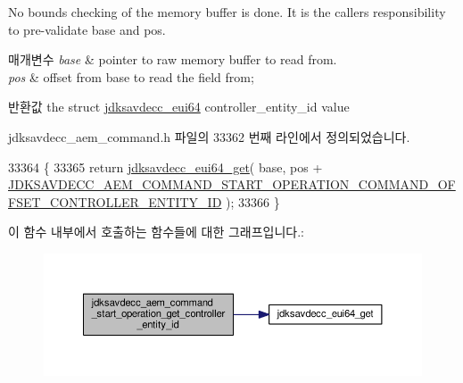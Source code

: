 No bounds checking of the memory buffer is done. It is the caller\textquotesingle{}s responsibility to pre-\/validate base and pos.


\begin{DoxyParams}{매개변수}
{\em base} & pointer to raw memory buffer to read from. \\
\hline
{\em pos} & offset from base to read the field from; \\
\hline
\end{DoxyParams}
\begin{DoxyReturn}{반환값}
the struct \hyperlink{structjdksavdecc__eui64}{jdksavdecc\+\_\+eui64} controller\+\_\+entity\+\_\+id value 
\end{DoxyReturn}


jdksavdecc\+\_\+aem\+\_\+command.\+h 파일의 33362 번째 라인에서 정의되었습니다.


\begin{DoxyCode}
33364 \{
33365     \textcolor{keywordflow}{return} \hyperlink{group__eui64_ga2652311a25a6b91cddbed75c108c7031}{jdksavdecc\_eui64\_get}( base, pos + 
      \hyperlink{group__command__start__operation_gac5897e9435a0735843ccef9a07d4e449}{JDKSAVDECC\_AEM\_COMMAND\_START\_OPERATION\_COMMAND\_OFFSET\_CONTROLLER\_ENTITY\_ID}
       );
33366 \}
\end{DoxyCode}


이 함수 내부에서 호출하는 함수들에 대한 그래프입니다.\+:
\nopagebreak
\begin{figure}[H]
\begin{center}
\leavevmode
\includegraphics[width=350pt]{group__command__start__operation_gab93f259b034934b890bc6aa68b755b14_cgraph}
\end{center}
\end{figure}


